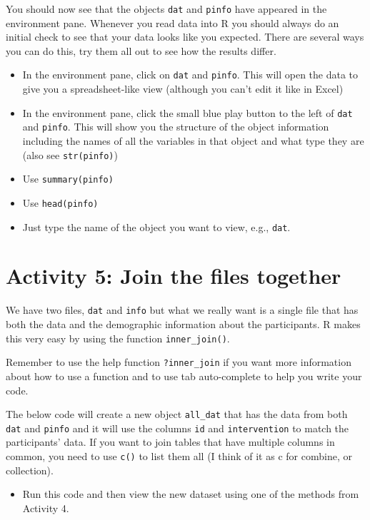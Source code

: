 \documentclass[
  oneside]{book}
\providecommand{\tightlist}{%
  \setlength{\itemsep}{0pt}\setlength{\parskip}{0pt}}
\begin{document}
You should now see that the objects \texttt{dat} and \texttt{pinfo} have appeared in the environment pane. Whenever you read data into R you should always do an initial check to see that your data looks like you expected. There are several ways you can do this, try them all out to see how the results differ.

\begin{itemize}
\tightlist
\item
  In the environment pane, click on \texttt{dat} and \texttt{pinfo}. This will open the data to give you a spreadsheet-like view (although you can't edit it like in Excel)
\item
  In the environment pane, click the small blue play button to the left of \texttt{dat} and \texttt{pinfo}. This will show you the structure of the object information including the names of all the variables in that object and what type they are (also see \texttt{str(pinfo)})
\item
  Use \texttt{summary(pinfo)}
\item
  Use \texttt{head(pinfo)}
\item
  Just type the name of the object you want to view, e.g., \texttt{dat}.
\end{itemize}

\hypertarget{activity-5-join-the-files-together}{%
\section{Activity 5: Join the files together}\label{activity-5-join-the-files-together}}

We have two files, \texttt{dat} and \texttt{info} but what we really want is a single file that has both the data and the demographic information about the participants. R makes this very easy by using the function \texttt{inner\_join()}.

Remember to use the help function \texttt{?inner\_join} if you want more information about how to use a function and to use tab auto-complete to help you write your code.

The below code will create a new object \texttt{all\_dat} that has the data from both \texttt{dat} and \texttt{pinfo} and it will use the columns \texttt{id} and \texttt{intervention} to match the participants' data. If you want to join tables that have multiple columns in common, you need to use \texttt{c()} to list them all (I think of it as c for combine, or collection).

\begin{itemize}
\tightlist
\item
  Run this code and then view the new dataset using one of the methods from Activity 4.
\end{itemize}
\end{document}
